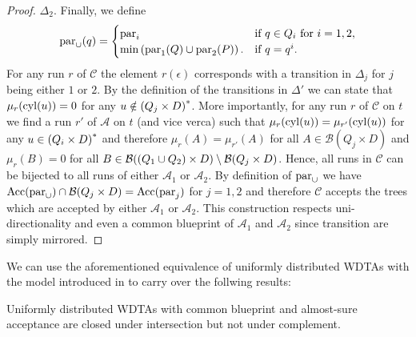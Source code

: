 \begin{proof}
  $\Delta_{2}$. Finally, we define
  \begin{equation*}
    \operatorname{par}_{\cup}(q) = \begin{cases}
      \operatorname{par}_{i}&\text{if }q\in Q_{i}\text{ for }i = 1,2,\\
      \min\left(\operatorname{par}_{1}(Q)\cup\operatorname{par}_{2}(P)\right).&\text{if }q = q^{i}.
    \end{cases}
  \end{equation*}
  For any run $r$ of $\mathcal{C}$ the element $r(\epsilon)$ corresponds with a
  transition in $\Delta_{j}$ for $j$ being either $1$ or $2$. By the definition
  of the transitions in $\Delta'$ we can state that $\mu_{r}(\operatorname{cyl}(u)) = 0$ for
  any $u\notin\left(Q_{j}\times D\right)^{*}$. More importantly, for any run $r$ of
  $\mathcal{C}$ on $t$ we find a run $r'$ of $\mathcal{A}$ on $t$ (and vice
  verca) such that $\mu_{r}(\operatorname{cyl}(u)) = \mu_{r'}(\operatorname{cyl}(u))$ for any 
  $u\in\left(Q_{i}\times D\right)^{*}$ and therefore $\mu_{r}(A) = \mu_{r'}(A)$ for
  all $A\in\mathcal{B}(Q_{j}\times D)$ and $\mu_{r}(B) = 0$ for all 
  $B\in\mathcal{B}(\left(Q_{1}\cup Q_{2}\right)\times D)
    \setminus\mathcal{B}(Q_{j}\times D)$. Hence, all runs in $\mathcal{C}$
  can be bijected to all runs of either $\mathcal{A}_{1}$ or $\mathcal{A}_{2}$.
  By definition of $\operatorname{par}_{\cup}$ we have 
  $\operatorname{Acc}(\operatorname{par}_{\cup})\cap\mathcal{B}(Q_{j}\times D) = \operatorname{Acc}(\operatorname{par}_{j})$ for
  $j = 1,2$ and therefore $\mathcal{C}$ accepts the trees which are accepted by 
  either $\mathcal{A}_{1}$ or $\mathcal{A}_{2}$. This construction respects 
  uni-directionality and even a common blueprint of $\mathcal{A}_{1}$ and 
  $\mathcal{A}_{2}$ since transition are simply mirrored.
\end{proof}

We can use the aforementioned equivalence of uniformly distributed \acp{WDTA} 
with the model introduced in \cite{RandAutoInfTrees} to carry over the follwing
results:
\begin{proposition}
  \cite[Proposition 14, Proposition 15]{RandAutoInfTrees}
  Uniformly distributed \acp{WDTA} with common blueprint and almost-sure 
  acceptance are closed under intersection but not under complement.
\end{proposition}

